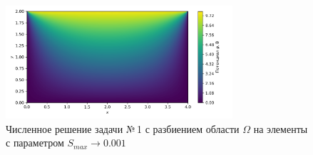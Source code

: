 \documentclass[12pt, a4paper]{article}
\begin{document}
			
			
			\begin{figure}[!h]
				\centering
				\includegraphics[width=0.75\textwidth]{rect_dirichlet_only_0001_calfem.png}
				\caption{Численное решение задачи №\,1 с разбиением области $\Omega$ на элементы с параметром $S_{max} \rightarrow 0.001$}
				\label{fig:dom_rect_0001}
			\end{figure}
			
			
					
					
					
					
					
					
\end{document}
